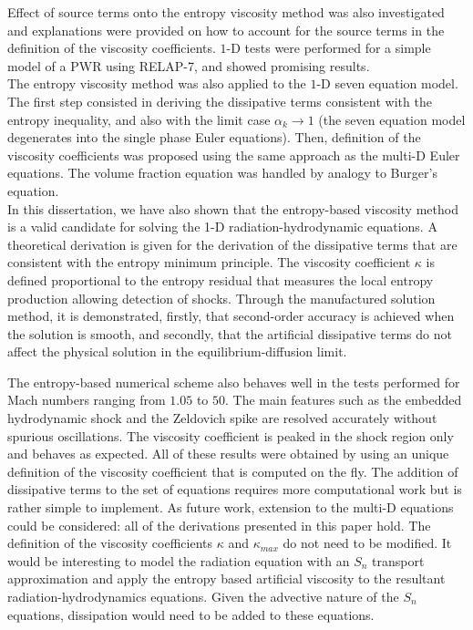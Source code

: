 Effect of source terms onto the entropy viscosity method was also investigated and explanations were provided on how to account for the source terms in the definition of the viscosity coefficients. $1$-D tests were performed for a simple model of a PWR using RELAP-7, and showed promising results. \\

The entropy viscosity method was also applied to the $1$-D seven equation model. The first step consisted in deriving the dissipative terms consistent with the entropy inequality, and also with the limit case $\alpha_k \to 1$ (the seven equation model degenerates into the single phase Euler equations). Then, definition of the viscosity coefficients was proposed using the same approach as the multi-D Euler equations. The volume fraction equation was handled by analogy to Burger's equation. \\

In this dissertation, we have also shown that the entropy-based viscosity method is a valid candidate for solving the 1-D radiation-hydrodynamic equations. A theoretical derivation is given for the derivation of the dissipative terms that are consistent with the entropy minimum principle. The viscosity coefficient $\kappa$ is defined proportional to the entropy residual that measures the local entropy production allowing detection of shocks. Through the manufactured solution method, it is demonstrated, firstly, that second-order accuracy is achieved when the solution is smooth, and secondly, that the artificial dissipative terms do not affect the physical solution in the equilibrium-diffusion limit. 

The entropy-based numerical scheme also behaves well in the tests performed for Mach numbers ranging from $1.05$ to $50$. The main features such as the embedded hydrodynamic shock and the Zeldovich spike are resolved accurately without spurious oscillations. The viscosity coefficient is peaked in the shock region only and behaves as expected. All of these results were obtained by using an unique definition of the viscosity coefficient that is computed on the fly. The addition of dissipative terms to the set of equations requires more computational work but is rather simple to implement.
As future work, extension to the multi-D equations could be considered: all of the derivations presented in this paper hold. The definition of the viscosity coefficients $\kappa$ and $\kappa_{max}$ do not need to be modified. It would be interesting to model the radiation equation with an $S_n$ transport approximation and apply the entropy based artificial viscosity to the resultant radiation-hydrodynamics equations. Given the advective nature of the $S_n$ equations, dissipation would need to be added to these equations.